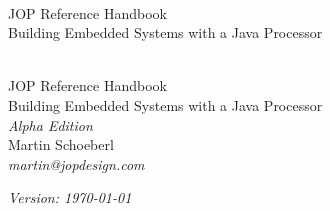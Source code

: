 \setcounter{page}{1}

\begin{flushleft}
\pagestyle{empty}
\ \\
\vspace{1cm}
{\mdseries\Large JOP Reference Handbook\\
\medskip
\large Building Embedded Systems with a Java Processor}
\cleardoublepage
\end{flushleft}


\begin{flushleft}
\pagestyle{empty}
\ \\
\vspace{1cm}
{\huge JOP Reference Handbook\\
\mdseries
{\Large Building Embedded Systems with a Java Processor}\\
\bigskip
{\large\itshape Alpha Edition}\\
\bigskip
{\Large Martin Schoeberl}
\medskip\\
{\large\itshape martin@jopdesign.com} }


\vspace{10cm} \emph{Version: \today}
\newpage
\end{flushleft}




